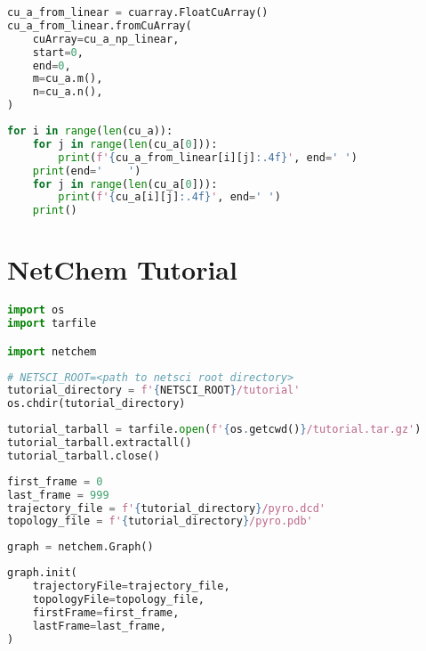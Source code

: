 \documentclass{article}
\begin{document}
    \begin{lstlisting}[language=Python]
cu_a_from_linear = cuarray.FloatCuArray()
cu_a_from_linear.fromCuArray(
    cuArray=cu_a_np_linear,
    start=0,
    end=0,
    m=cu_a.m(),
    n=cu_a.n(),
)
    \end{lstlisting}

    \begin{lstlisting}[language=Python]
for i in range(len(cu_a)):
    for j in range(len(cu_a[0])):
        print(f'{cu_a_from_linear[i][j]:.4f}', end=' ')
    print(end='    ')
    for j in range(len(cu_a[0])):
        print(f'{cu_a[i][j]:.4f}', end=' ')
    print()
    \end{lstlisting}


    \section{NetChem Tutorial}
    \begin{lstlisting}[language=Python]
import os
import tarfile

import netchem
    \end{lstlisting}

    \begin{lstlisting}[language=Python]
# NETSCI_ROOT=<path to netsci root directory>
tutorial_directory = f'{NETSCI_ROOT}/tutorial'
os.chdir(tutorial_directory)
    \end{lstlisting}

    \begin{lstlisting}[language=Python]
tutorial_tarball = tarfile.open(f'{os.getcwd()}/tutorial.tar.gz')
tutorial_tarball.extractall()
tutorial_tarball.close()
    \end{lstlisting}

    \begin{lstlisting}[language=Python]
first_frame = 0
last_frame = 999
trajectory_file = f'{tutorial_directory}/pyro.dcd'
topology_file = f'{tutorial_directory}/pyro.pdb'
    \end{lstlisting}

    \begin{lstlisting}[language=Python]
graph = netchem.Graph()
    \end{lstlisting}

    \begin{lstlisting}[language=Python]
graph.init(
    trajectoryFile=trajectory_file,
    topologyFile=topology_file,
    firstFrame=first_frame,
    lastFrame=last_frame,
)
    \end{lstlisting}
\end{document}

